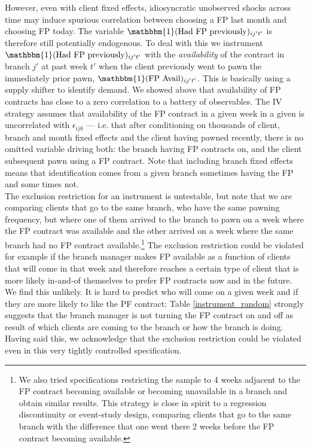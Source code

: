 \documentclass[oneside,11pt]{article}
\begin{document}
However, even with client fixed effects, idiosyncratic unobserved shocks across time may induce spurious correlation between choosing a FP last month and choosing FP today. The variable $\mathbbm{1}(\text{Had FP previously})_{ij't'}$ is therefore still potentially endogenous. To deal with this we instrument $\mathbbm{1}(\text{Had FP previously})_{ij't'}$ with the \textit{availability} of the contract in branch $j'$ at past week $t'$ when the client previously went to pawn the immediately prior pawn, $\mathbbm{1}(\text{FP Avail})_{ij't'}$. This is basically using a supply shifter to identify demand. We showed above that availability of FP contracts has close to a zero correlation to a battery of observables. The IV strategy assumes that availability of the FP contract in a given week in a given is uncorrelated with $\epsilon_{ijk}$ --- i.e. that after conditioning on thousands of client, branch and month fixed effects and the client having pawned recently, there is no omitted variable driving both: the branch having FP contracts on, and the client subsequent pawn using a FP contract. Note that including branch fixed effects means that identification comes from a given branch sometimes having the FP and some times not. \\

The exclusion restriction for an instrument is untestable, but note that we are comparing clients that go to the same branch, who have the same pawning frequency, but where one of them arrived to the branch to pawn on a week where the FP contract was available and the other arrived on a week where the same branch had no FP contract available.\footnote{We also tried specifications restricting the sample to 4 weeks adjacent to the FP contract becoming available or becoming unavailable in a branch and obtain similar results. This strategy is close in spirit to a regression discontinuity or event-study design, comparing clients that go to the same branch with the difference that one went there 2 weeks before the FP contract becoming available.} The exclusion restriction could be violated for example if the branch manager makes FP available as a function of clients that will come in that week and therefore reaches a certain type of client that is more likely in-and-of themselves to prefer FP contracts now and in the future. We find this unlikely. It is hard to predict who will come on a given week and if they are more likely to like the PF contract: Table \ref{instrument_random} strongly suggests that the branch manager is not turning the FP contract on and off as result of which clients are coming to the branch or how the branch is doing. Having said this, we acknowledge that the exclusion restriction could be violated even in this very tightly controlled specification.\\
\end{document}
